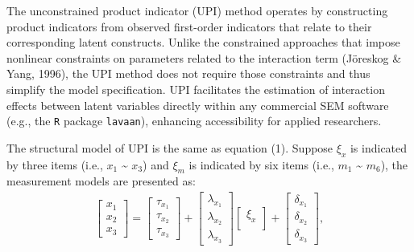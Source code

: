 \documentclass[
  man]{apa7}
\begin{document}
The unconstrained product indicator (UPI) method operates by constructing product indicators from observed first-order indicators that relate to their corresponding latent constructs. Unlike the constrained approaches that impose nonlinear constraints on parameters related to the interaction term (Jöreskog \& Yang, 1996), the UPI method does not require those constraints and thus simplify the model specification. UPI facilitates the estimation of interaction effects between latent variables directly within any commercial SEM software (e.g., the \texttt{R} package \texttt{lavaan}), enhancing accessibility for applied researchers.

The structural model of UPI is the same as equation (1). Suppose \(\xi_{x}\) is indicated by three items (i.e., \(x_{1}\) \textasciitilde{} \(x_{3}\)) and \(\xi_{m}\) is indicated by six items (i.e., \(m_{1}\) \textasciitilde{} \(m_{6}\)), the measurement models are presented as:
\begin{align}
    \begin{bmatrix}
        x_{1} \\
        x_{2} \\ 
        x_{3}
    \end{bmatrix} =
    \begin{bmatrix}
        \tau_{x_{1}} \\
        \tau_{x_{2}} \\ 
        \tau_{x_{3}}
    \end{bmatrix} +
    \begin{bmatrix}
        \lambda_{x_{1}} \\
        \lambda_{x_{2}} \\ 
        \lambda_{x_{3}}
    \end{bmatrix}
    \begin{bmatrix}
        \xi_{x} \\
    \end{bmatrix} +
    \begin{bmatrix}
        \delta_{x_{1}} \\
        \delta_{x_{2}} \\ 
        \delta_{x_{3}}
    \end{bmatrix},
\end{align}
\end{document}
